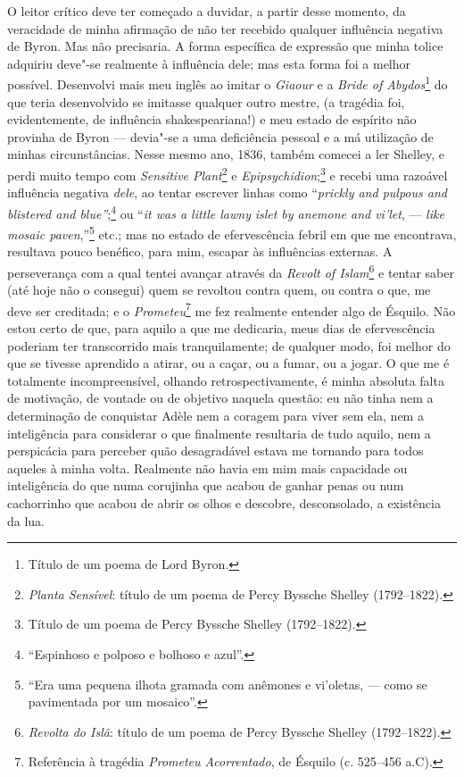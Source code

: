 O leitor crítico deve ter começado a duvidar, a partir desse
momento, da veracidade de minha afirmação de não ter recebido qualquer
influência negativa de Byron. Mas não precisaria. A forma específica de
expressão que minha tolice adquiriu deve"-se realmente à influência dele;
mas esta forma foi a melhor possível. Desenvolvi mais meu inglês ao
imitar o \textit{Giaour} e a \textit{Bride of Abydos}\footnote{Título de um
  poema de Lord Byron.} do que teria desenvolvido se
imitasse qualquer outro mestre, (a tragédia foi, evidentemente, de
influência shakespeariana!) e meu estado de espírito não provinha de
Byron --- devia"-se a uma deficiência pessoal e a má utilização de minhas
circunstâncias. Nesse mesmo ano, 1836, também comecei a ler Shelley, e
perdi muito tempo com \textit{Sensitive Plant}\footnote{\textit{Planta
  Sensível}: título de um poema de Percy Byssche Shelley (1792--1822).} e \textit{Epipsychidion};\footnote{Título de um poema de
  Percy Byssche Shelley (1792--1822).} e recebi uma
razoável influência negativa \textit{dele}, ao tentar escrever linhas como
``\textit{prickly and pulpous and blistered and blue''};\footnote{``Espinhoso
  e polposo e bolhoso e azul''.} ou ``\textit{it was a
little lawny} \textit{islet by anemone and vi'let}, --- \textit{like mosaic
paven},''\footnote{``Era uma pequena ilhota gramada com anêmones e
  vi'oletas, --- como se pavimentada por um mosaico''.}
etc.; mas no estado de efervescência febril em que me encontrava,
resultava pouco benéfico, para mim, escapar às influências externas. A
perseverança com a qual tentei avançar através da \textit{Revolt of
Islam}\footnote{\textit{Revolta do Islã}: título de um poema de Percy
  Byssche Shelley (1792--1822).} e tentar saber (até hoje
não o consegui) quem se revoltou contra quem, ou contra o que, me deve
ser creditada; e o \textit{Prometeu}\footnote{Referência à tragédia
  \textit{Prometeu Acorrentado}, de Ésquilo (c. 525--456 a.C).} me fez realmente entender algo de Ésquilo. Não estou
certo de que, para aquilo a que me dedicaria, meus dias de efervescência
poderiam ter transcorrido mais tranquilamente; de qualquer modo, foi
melhor do que se tivesse aprendido a atirar, ou a caçar, ou a fumar, ou
a jogar. O que me é totalmente incompreensível, olhando
retrospectivamente, é minha absoluta falta de motivação, de vontade ou
de objetivo naquela questão: eu não tinha nem a determinação de
conquistar Adèle nem a coragem para viver sem ela, nem a inteligência
para considerar o que finalmente resultaria de tudo aquilo, nem a
perspicácia para perceber quão desagradável estava me tornando para
todos aqueles à minha volta. Realmente não havia em mim mais capacidade
ou inteligência do que numa corujinha que acabou de ganhar penas ou num
cachorrinho que acabou de abrir os olhos e descobre, desconsolado, a
existência da lua.

